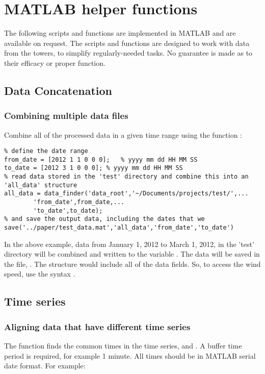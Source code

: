 \chapter{MATLAB helper functions}
The following scripts and functions are implemented in MATLAB and are available on request. The scripts and functions are designed to work with data from the towers, to simplify regularly-needed tasks. No guarantee is made as to their efficacy or proper function.

\section{Data Concatenation}
\subsection[\mfunction{data\_finder()}]{Combining multiple data files\label{sec:data_finder}}
Combine all of the processed data in a given time range using the function :

\begin{lstlisting}
% define the date range
from_date = [2012 1 1 0 0 0];	% yyyy mm dd HH MM SS
to_date = [2012 3 1 0 0 0];	% yyyy mm dd HH MM SS
% read data stored in the 'test' directory and combine this into an 'all_data' structure
all_data = data_finder('data_root','~/Documents/projects/test/',...
        'from_date',from_date,...
        'to_date',to_date);
% and save the output data, including the dates that we    
save('../paper/test_data.mat','all_data','from_date','to_date')
\end{lstlisting}

In the above example, data from January 1, 2012 to March 1, 2012, in the 'test' directory will be combined and written to the variable . The data will be saved in the file, . The  structure would include all of the data fields. So, to access the wind speed, use the syntax .

\section{Time series}
\subsection[\mfunction{get\_common\_times()}]{Aligning data that have different time series}
The function  finds the common times in the time series,  and . A buffer time period  is required, for example 1 minute. All times should be in MATLAB serial date format. For example:

